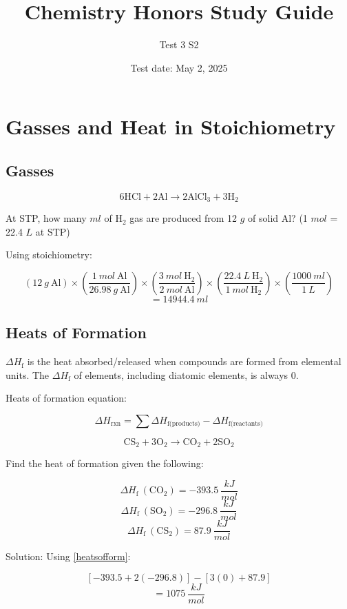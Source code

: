 \documentclass[a4paper, 12pt]{article}
\title{Chemistry Honors Study Guide}
\author{Test 3 S2}
\date{Test date: May 2, 2025}
\newcommand{\Hf}{$\Delta H_\text{f}$} %
\newcommand{\mathHf}{\Delta H_\text{f}} %
\begin{document}
\maketitle

\section{Gasses and Heat in Stoichiometry}

\subsection*{Gasses}
$$6 \text{HCl} + 2 \text{Al} \longrightarrow 2 \text{AlCl}_3 + 3\text{H}_2$$

At STP, how many $ml$ of H$_2$ gas are produced from 12 $g$ of solid Al? (1 $mol$ = 22.4 $L$ at STP)

Using stoichiometry:

$$(12 \: g \: \text{Al}) \times \left(\frac{1 \: mol \: \text{Al}}{26.98 \: g \: \text{Al}}\right) \times \left(\frac{3 \: mol \: \text{H}_2}{2 \: mol \: \text{Al}}\right) \times \left(\frac{22.4 \: L \: \text{H}_2}{1 \: mol \: \text{H}_2}\right) \times \left(\frac{1000 \: ml}{1 \: L}\right)$$
$$ = \boxed{14944.4 \: ml}$$

\subsection*{Heats of Formation}
\Hf{} is the heat absorbed/released when compounds are formed from elemental units. The \Hf{} of elements, including diatomic elements, is always 0.

Heats of formation equation:

\begin{equation} \label{heatsofform}
\Delta H_\text{rxn} = \sum \Delta H_\text{f(products)} -  \Delta H_\text{f(reactants)}
\end{equation}

$$\text{CS}_2 + 3\text{O}_2 \longrightarrow \text{CO}_2 + 2\text{SO}_2$$

Find the heat of formation given the following: 

$$\mathHf \: (\text{CO}_2) = -393.5 \: \frac{kJ}{mol}$$
$$\mathHf \: (\text{SO}_2) = -296.8 \: \frac{kJ}{mol}$$
$$\mathHf \: (\text{CS}_2) = 87.9 \: \frac{kJ}{mol}$$

Solution: Using \ref{heatsofform}:

$$ [-393.5 + 2(-296.8)] - [3(0) + 87.9] $$
$$ = \boxed{1075 \: \frac{kJ}{mol}} $$
\end{document}
